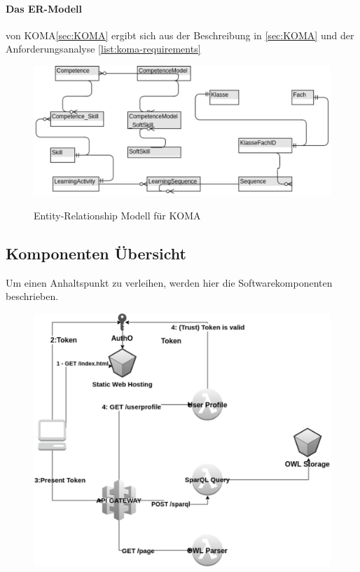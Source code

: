 \documentclass[
12pt,
english,
ngerman,
headsepline,
twoside,
openright,
numbers=noenddot,version=first
]{scrreprt}
\begin{document}
\paragraph{Das ER-Modell} von \acrshort{KOMA}\ref{sec:KOMA} ergibt sich aus der Beschreibung in \autoref{sec:KOMA} und der Anforderungsanalyse \ref{list:koma-requirements}
\begin{figure}[h]
	\centering
	\includegraphics[scale=1]{./pics/koma-er-concept.eps}
	\label{pic:koma-er-concept}
	\caption{Entity-Relationship Modell für KOMA}
\end{figure}



\subsection{Komponenten Übersicht}
\label{sec:components}
Um einen Anhaltspunkt zu verleihen, werden hier die Softwarekomponenten beschrieben.

\begin{figure}[H]
	\includegraphics[width=\linewidth]{./pics/static-web-hosting.eps}
\end{figure}
\end{document}
